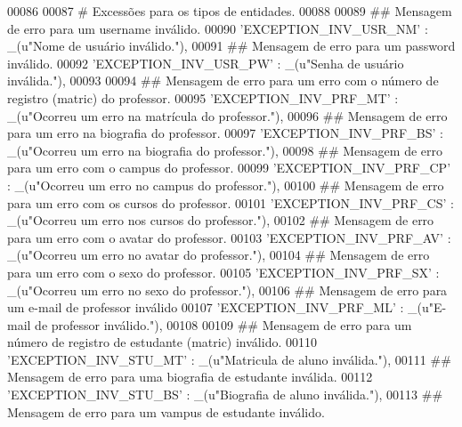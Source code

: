 \begin{DoxyCode}
00086 
00087     \textcolor{comment}{# Excessões para os tipos de entidades.}
00088 
00089     \textcolor{comment}{## Mensagem de erro para um username inválido.}
00090     \textcolor{stringliteral}{'EXCEPTION\_INV\_USR\_NM'} : \_(\textcolor{stringliteral}{u"Nome de usuário inválido."}),
00091     \textcolor{comment}{## Mensagem de erro para um password inválido.}
00092     \textcolor{stringliteral}{'EXCEPTION\_INV\_USR\_PW'} : \_(\textcolor{stringliteral}{u"Senha de usuário inválida."}),
00093 
00094     \textcolor{comment}{## Mensagem de erro para um erro com o número de registro (matric) do professor.}
00095     \textcolor{stringliteral}{'EXCEPTION\_INV\_PRF\_MT'} : \_(\textcolor{stringliteral}{u"Ocorreu um erro na matrícula do professor."}),
00096     \textcolor{comment}{## Mensagem de erro para um erro na biografia do professor.}
00097     \textcolor{stringliteral}{'EXCEPTION\_INV\_PRF\_BS'} : \_(\textcolor{stringliteral}{u"Ocorreu um erro na biografia do professor."}),
00098     \textcolor{comment}{## Mensagem de erro para um erro com o campus do professor.}
00099     \textcolor{stringliteral}{'EXCEPTION\_INV\_PRF\_CP'} : \_(\textcolor{stringliteral}{u"Ocorreu um erro no campus do professor."}),
00100     \textcolor{comment}{## Mensagem de erro para um erro com os cursos do professor.}
00101     \textcolor{stringliteral}{'EXCEPTION\_INV\_PRF\_CS'} : \_(\textcolor{stringliteral}{u"Ocorreu um erro nos cursos do professor."}),
00102     \textcolor{comment}{## Mensagem de erro para um erro com o avatar do professor.}
00103     \textcolor{stringliteral}{'EXCEPTION\_INV\_PRF\_AV'} : \_(\textcolor{stringliteral}{u"Ocorreu um erro no avatar do professor."}),
00104     \textcolor{comment}{## Mensagem de erro para um erro com o sexo do professor.}
00105     \textcolor{stringliteral}{'EXCEPTION\_INV\_PRF\_SX'} : \_(\textcolor{stringliteral}{u"Ocorreu um erro no sexo do professor."}),
00106     \textcolor{comment}{## Mensagem de erro para um e-mail de professor inválido}
00107     \textcolor{stringliteral}{'EXCEPTION\_INV\_PRF\_ML'} : \_(\textcolor{stringliteral}{u"E-mail de professor inválido."}),
00108 
00109     \textcolor{comment}{## Mensagem de erro para um número de registro de estudante (matric) inválido.}
00110     \textcolor{stringliteral}{'EXCEPTION\_INV\_STU\_MT'} : \_(\textcolor{stringliteral}{u"Matricula de aluno inválida."}),
00111     \textcolor{comment}{## Mensagem de erro para uma biografia de estudante inválida.}
00112     \textcolor{stringliteral}{'EXCEPTION\_INV\_STU\_BS'} : \_(\textcolor{stringliteral}{u"Biografia de aluno inválida."}),
00113     \textcolor{comment}{## Mensagem de erro para um vampus de estudante inválido.}

\end{DoxyCode}

